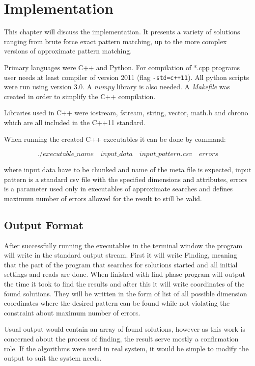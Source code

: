 \chapter{Implementation}
This chapter will discuss the implementation. It presents a variety of solutions ranging from brute force exact pattern matching, up to the more complex versions of approximate pattern matching.

Primary languages were C++ and Python. For compilation of *.cpp programs user needs at least compiler of version 2011 (flag \texttt{-std=c++11}). All python scripts were run using version 3.0. A \textit{numpy} library is also needed. A \textit{Makefile} was created in order to simplify the C++ compilation.

Libraries used in C++ were iostream, fstream, string, vector, math.h and chrono which are all included in the C++11 standard.

When running the created C++ executables it can be done by command:

$$./executable\_name\quad input\_data\quad input\_pattern.csv\quad errors$$  

where input data have to be chunked and name of the meta file is expected, input pattern is a standard csv file with the specified dimensions and attributes, errors is a parameter used only in executables of approximate searches and defines maximum number of errors allowed for the result to still be valid.

\section{Output Format}
After successfully running the executables in the terminal window the program will write in the standard output stream. First it will write Finding, meaning that the part of the program that searches for solutions started and all initial settings and reads are done. When finished with find phase program will output the time it took to find the results and after this it will write coordinates of the found solutions. They will be written in the form of list of all possible dimension coordinates where the desired pattern can be found while not violating the constraint about maximum number of errors.

Usual output would contain an array of found solutions, however as this work is concerned about the process of finding, the result serve mostly a confirmation role. If the algorithms were used in real system, it would be simple to modify the output to suit the system needs.


